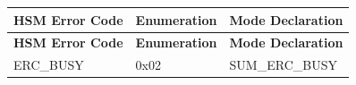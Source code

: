 \begin{longtable}{|l|l|l|}
\hline
\begin{minipage}{0.38\linewidth}\raggedright\vspace{.75ex}\textbf{HSM Error Code}\vspace{.75ex}\end{minipage} & \begin{minipage}{0.15\linewidth}\raggedright\vspace{.75ex}\textbf{Enumeration}\vspace{.75ex}\end{minipage} & \begin{minipage}{0.38\linewidth}\raggedright\vspace{.75ex}\textbf{Mode Declaration}\vspace{.75ex}\end{minipage}\\
\hline\hline
\endfirsthead
\hline
\begin{minipage}{0.38\linewidth}\raggedright\vspace{.75ex}\textbf{HSM Error Code}\vspace{.75ex}\end{minipage} & \begin{minipage}{0.15\linewidth}\raggedright\vspace{.75ex}\textbf{Enumeration}\vspace{.75ex}\end{minipage} & \begin{minipage}{0.38\linewidth}\raggedright\vspace{.75ex}\textbf{Mode Declaration}\vspace{.75ex}\end{minipage}\\
\hline\hline
\endhead
\hline
\endfoot
\hline
\endlastfoot
\begin{minipage}{0.38\linewidth}\raggedright\vspace{.75ex}ERC\_BUSY\vspace{.75ex}\end{minipage} & \begin{minipage}{0.15\linewidth}\raggedright\vspace{.75ex}0x02\vspace{.75ex}\end{minipage} & \begin{minipage}{0.38\linewidth}\raggedright\vspace{.75ex}SUM\_ERC\_BUSY\vspace{.75ex}\end{minipage}\\\hline

\end{longtable}
